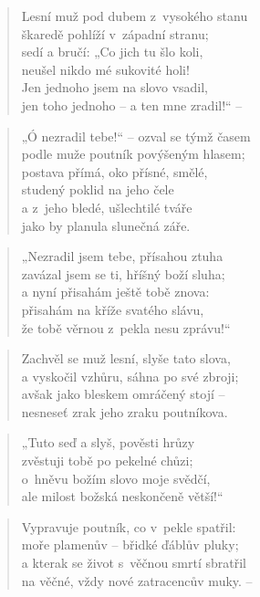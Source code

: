 \begin{verse}
Lesní muž pod dubem z~vysokého stanu \\
škaredě pohlíží v~západní stranu; \\
sedí a bručí: „Co jich tu šlo koli, \\
neušel nikdo mé sukovité holi! \\
Jen jednoho jsem na slovo vsadil, \\
jen toho jednoho -- a ten mne zradil!“ --
\end{verse}

\begin{verse}
„Ó nezradil tebe!“ -- ozval se týmž časem \\
podle muže poutník povýšeným hlasem; \\
postava přímá, oko přísné, smělé, \\
studený poklid na jeho čele \\
a z~jeho bledé, ušlechtilé tváře \\
jako by planula slunečná záře.
\end{verse}

\begin{verse}
„Nezradil jsem tebe, přísahou ztuha \\
zavázal jsem se ti, hříšný boží sluha; \\
a nyní přisahám ještě tobě znova: \\
přisahám na kříže svatého slávu, \\
že tobě věrnou z~pekla nesu zprávu!“
\end{verse}

\begin{verse}
Zachvěl se muž lesní, slyše tato slova, \\
a vyskočil vzhůru, sáhna po své zbroji; \\
avšak jako bleskem omráčený stojí -- \\
nesneseť zrak jeho zraku poutníkova.
\end{verse}

\begin{verse}
„Tuto seď a slyš, pověsti hrůzy \\
zvěstuji tobě po pekelné chůzi; \\
o~hněvu božím slovo moje svědčí, \\
ale milost božská neskončeně větší!“
\end{verse}

\begin{verse}
Vypravuje poutník, co v~pekle spatřil: \\
moře plamenův -- břidké ďáblův pluky; \\
a kterak se život s~věčnou smrtí sbratřil \\
na věčné, vždy nové zatracencův muky. --
\end{verse}


